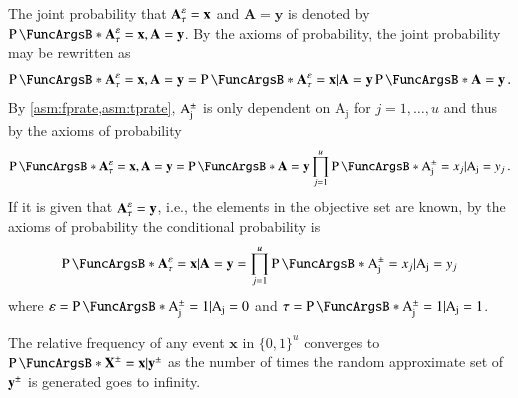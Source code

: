 \documentclass[10pt,final,hidelinks]{article}
\numberwithin{equation}{section}
\providecommand{\Given}{\vert}
\newcommand{\PS}[1]{2^{#1}}
\newcommand{\tprate}{\tau}
\newcommand{\fprate}{\varepsilon}
\newcommand{\fprateob}{\hat{\fprate}}
\newcommand{\tprateob}{\hat{\tprate}}
\newcommand{\RV}[1]{\mathrm{#1}}
\theoremstyle{plain}
\renewcommand{\vec}[1]{\boldsymbol{\mathbf{#1}}}
\begin{document}
The joint probability that $\AVec{A}[\tprate][\fprate] = \vec{x}$ and $\vec{A} = \vec{y}$ is denoted by $\Prob{\AVec{A}[\tprate][\fprate] = \vec{x},\vec{A} = \vec{y}}$.
By the axioms of probability, the joint probability may be rewritten as
\begin{equation}
    \Prob{\AVec{A}[\tprate][\fprate] = \vec{x},\vec{A} = \vec{y}} =
        \Prob{\AVec{A}[\tprate][\fprate] = \vec{x} \Given \vec{A} = \vec{y}}
        \Prob{\vec{A} = \vec{y}}\,.
\end{equation}
By \cref{asm:fprate,asm:tprate}, $\AVecComp{A}[j]$ is only dependent on 
$\RV{A_j}$ for $j=1,\ldots,u$ and thus by the axioms of probability
\begin{equation}
    \Prob{\AVec{A}[\tprate][\fprate] = \vec{x},\vec{A} = \vec{y}} = 
    \Prob{\vec{A} = \vec{y}} 
        \prod_{j=1}^{u} \Prob{\AVecComp{A}[j] = x_j \Given \RV{A_j} = y_j}\,.
\end{equation}
If it is given that $\AVec{A}[\tprate][\fprate] = \vec{y}$, i.e., the elements in the 
objective set are known, by the axioms of probability the conditional 
probability is
\begin{equation}
    \Prob{\AVec{A}[\tprate][\fprate] = \vec{x} \Given \vec{A} = \vec{y}} = \prod_{j=1}^{u} 
    \Prob{\AVecComp{A}[j] = x_j \Given \RV{A_j} = y_j}
\end{equation}
where $\fprate = \Prob{\AVecComp{A}[j]=1 \Given \RV{A_j}=0}$ and $\tprate = \Prob{\AVecComp{A}[j]=1 \Given \RV{A_j}=1}$.




The relative frequency of any event $\vec{x}$ in $\{0,1\}^u$ converges to $\Prob{\AVec{X} = \vec{x} \Given \AVec{y}}$ as the number of times the random approximate set of $\AVec{y}$ is generated goes to infinity.



\end{document}
